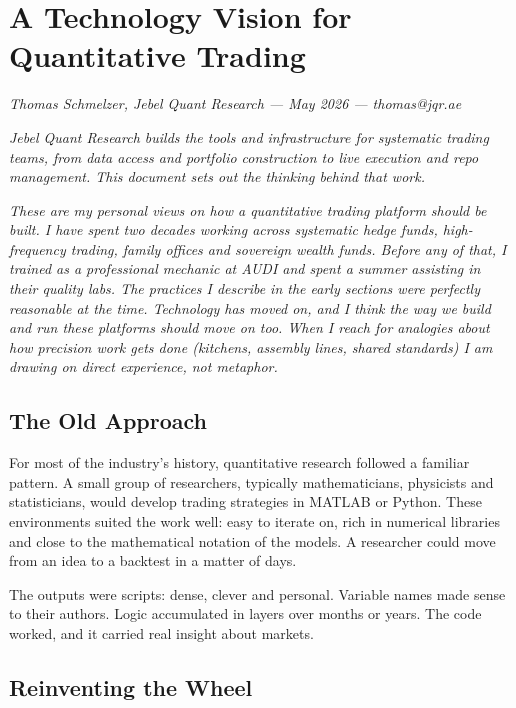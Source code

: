 \documentclass[
  11pt,
]{article}
\author{}
\date{}
\begin{document}
\section{A Technology Vision for Quantitative
Trading}\label{a-technology-vision-for-quantitative-trading}

\emph{Thomas Schmelzer, Jebel Quant Research --- May 2026 ---
thomas@jqr.ae}

\emph{Jebel Quant Research builds the tools and infrastructure for
systematic trading teams, from data access and portfolio construction
to live execution and repo management. This document sets out the
thinking behind that work.}

\emph{These are my personal views on how a quantitative trading platform
should be built. I have spent two decades working across systematic
hedge funds, high-frequency trading, family offices and sovereign wealth
funds. Before any of that, I trained as a professional mechanic at AUDI
and spent a summer assisting in their quality labs. The practices I
describe in the early sections were perfectly reasonable at the time.
Technology has moved on, and I think the way we build and run these
platforms should move on too. When I reach for analogies about how
precision work gets done (kitchens, assembly lines, shared standards)
I am drawing on direct experience, not metaphor.}

\subsection{The Old Approach}\label{the-old-approach}

For most of the industry's history, quantitative research followed a
familiar pattern. A small group of researchers, typically
mathematicians, physicists and statisticians, would develop trading
strategies in MATLAB or Python. These environments suited the work well:
easy to iterate on, rich in numerical libraries and close to the
mathematical notation of the models. A researcher could move from an
idea to a backtest in a matter of days.

The outputs were scripts: dense, clever and personal. Variable names
made sense to their authors. Logic accumulated in layers over months or
years. The code worked, and it carried real insight about markets.

\subsection{Reinventing the Wheel}\label{reinventing-the-wheel}
\end{document}

